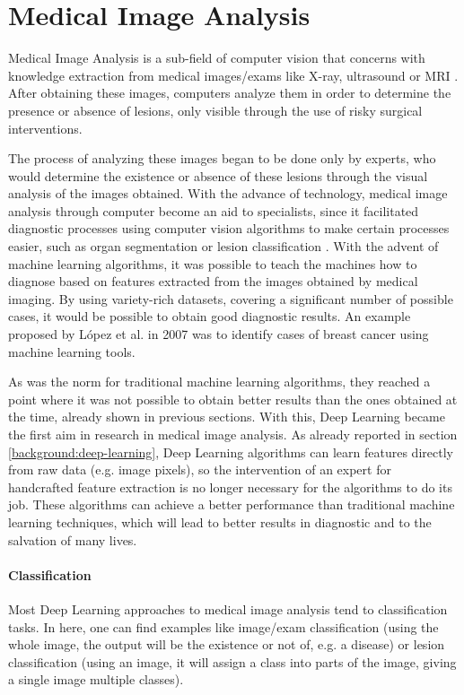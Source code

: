 \documentclass[
  twoside,
  11pt, a4paper,
  footinclude=true,
  headinclude=true,
  cleardoublepage=empty
]{scrbook}
\begin{document}
    \section{Medical Image Analysis} \label{background:medical-image}
      Medical Image Analysis is a sub-field of computer vision that concerns with knowledge extraction from medical images/exams like X-ray, ultrasound or MRI \cite{dhawan2011medical}. After obtaining these images, computers analyze them in order to determine the presence or absence of lesions, only visible through the use of risky surgical interventions.

      The process of analyzing these images began to be done only by experts, who would determine the existence or absence of these lesions through the visual analysis of the images obtained. With the advance of technology, medical image analysis through computer become an aid to specialists, since it facilitated diagnostic processes using computer vision algorithms to make certain processes easier, such as organ segmentation \cite{karssemeijer1988recognition, punia2013review} or lesion classification \cite{wolberg1994machine} . With the advent of machine learning algorithms, it was possible to teach the machines how to diagnose based on features extracted from the images obtained by medical imaging. By using variety-rich datasets, covering a significant number of possible cases, it would be possible to obtain good diagnostic results. An example proposed by López et al. in 2007 \cite{lopez2007breast} was to identify cases of breast cancer using machine learning tools.

      As was the norm for traditional machine learning algorithms, they reached a point where it was not possible to obtain better results than the ones obtained at the time, already shown in previous sections. With this, Deep Learning became the first aim in research in medical image analysis. As already reported in section \ref{background:deep-learning}, Deep Learning algorithms can learn features directly from raw data (e.g. image pixels), so the intervention of an expert for handcrafted feature extraction is no longer necessary for the algorithms to do its job. These algorithms can achieve a better performance than traditional machine learning techniques, which will lead to better results in diagnostic and to the salvation of many lives.

      \paragraph{Classification}
        Most Deep Learning approaches to medical image analysis tend to classification tasks. In here, one can find examples like image/exam classification (using the whole image, the output will be the existence or not of, e.g. a disease) or lesion classification (using an image, it will assign a class into parts of the image, giving a single image multiple classes).
\end{document}
